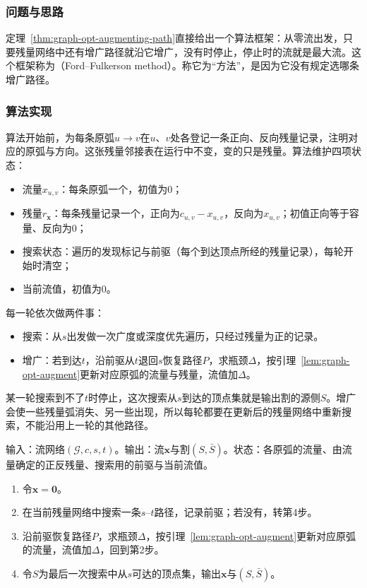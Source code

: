 \subsubsection{问题与思路}

定理~\ref{thm:graph-opt-augmenting-path}直接给出一个算法框架：从零流出发，只要残量网络中还有增广路径就沿它增广，没有时停止，停止时的流就是最大流。这个框架称为（Ford--Fulkerson method）。称它为“方法”，是因为它没有规定选哪条增广路径。

\subsubsection{算法实现}

算法开始前，为每条原弧$u\to v$在$u$、$v$处各登记一条正向、反向残量记录，注明对应的原弧与方向。这张残量邻接表在运行中不变，变的只是残量。算法维护四项状态：
\begin{itemize}
  \item 流量$x_{u,v}$：每条原弧一个，初值为$0$；
  \item 残量$r_{\bm x}$：每条残量记录一个，正向为$c_{u,v}-x_{u,v}$，反向为$x_{u,v}$；初值正向等于容量、反向为$0$；
  \item 搜索状态：遍历的发现标记与前驱（每个到达顶点所经的残量记录），每轮开始时清空；
  \item 当前流值，初值为$0$。
\end{itemize}

每一轮依次做两件事：
\begin{itemize}
  \item 搜索：从$s$出发做一次广度或深度优先遍历，只经过残量为正的记录。
  \item 增广：若到达$t$，沿前驱从$t$退回$s$恢复路径$P$，求瓶颈$\Delta$，按引理~\ref{lem:graph-opt-augment}更新对应原弧的流量与残量，流值加$\Delta$。
\end{itemize}
某一轮搜索到不了$t$时停止，这次搜索从$s$到达的顶点集就是输出割的源侧$S$。增广会使一些残量弧消失、另一些出现，所以每轮都要在更新后的残量网络中重新搜索，不能沿用上一轮的其他路径。

\begin{algorithm}
\label{alg:graph-opt-ford-fulkerson}
输入：流网络$(\mathcal G,c,s,t)$。输出：流$\bm x$与割$(S,\bar S)$。状态：各原弧的流量、由流量确定的正反残量、搜索用的前驱与当前流值。
\begin{enumerate}
  \item 令$\bm x=\bm 0$。
  \item 在当前残量网络中搜索一条$s$--$t$路径，记录前驱；若没有，转第4步。
  \item 沿前驱恢复路径$P$，求瓶颈$\Delta$，按引理~\ref{lem:graph-opt-augment}更新对应原弧的流量，流值加$\Delta$，回到第2步。
  \item 令$S$为最后一次搜索中从$s$可达的顶点集，输出$\bm x$与$(S,\bar S)$。
\end{enumerate}
\end{algorithm}

